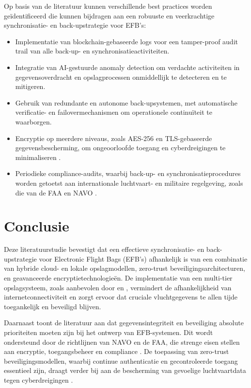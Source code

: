 Op basis van de literatuur kunnen verschillende best practices worden geïdentificeerd die kunnen bijdragen aan een robuuste en veerkrachtige synchronisatie- en back-upstrategie voor EFB’s:
\begin{itemize}
    \item Implementatie van blockchain-gebaseerde logs voor een tamper-proof audit trail van alle back-up- en synchronisatieactiviteiten.
    \item Integratie van AI-gestuurde anomaly detection om verdachte activiteiten in gegevensoverdracht en opslagprocessen onmiddellijk te detecteren en te mitigeren.
    \item Gebruik van redundante en autonome back-upsystemen, met automatische verificatie- en failovermechanismen om operationele continuïteit te waarborgen.
    \item Encryptie op meerdere niveaus, zoals AES-256 en TLS-gebaseerde gegevensbescherming, om ongeoorloofde toegang en cyberdreigingen te minimaliseren \autocite{NISTFIPS140}.
    \item Periodieke compliance-audits, waarbij back-up- en synchronisatieprocedures worden getoetst aan internationale luchtvaart- en militaire regelgeving, zoals die van de FAA \autocite{FAA_AC91-78A} en NAVO \autocite{AD070001}.
\end{itemize}

        
\section{Conclusie}
\label{sec:conclusie}

Deze literatuurstudie bevestigt dat een effectieve synchronisatie- en back-upstrategie voor Electronic Flight Bags (EFB’s) afhankelijk is van een combinatie van hybride cloud- en lokale opslagmodellen, zero-trust beveiligingsarchitecturen, en geavanceerde encryptietechnologieën. De implementatie van een multi-tier opslagsysteem, zoals aanbevolen door \textcite{AWSBackup} en \textcite{MicrosoftBackup}, vermindert de afhankelijkheid van internetconnectiviteit en zorgt ervoor dat cruciale vluchtgegevens te allen tijde toegankelijk en beveiligd blijven.

Daarnaast toont de literatuur aan dat gegevensintegriteit en beveiliging absolute prioriteiten moeten zijn bij het ontwerp van EFB-systemen. Dit wordt ondersteund door de richtlijnen van NAVO en de FAA, die strenge eisen stellen aan encryptie, toegangsbeheer en compliance \autocite{FAA_AC91-78A, AD070001}. De toepassing van zero-trust beveiligingsmodellen, waarbij continue authenticatie en gecontroleerde toegang essentieel zijn, draagt verder bij aan de bescherming van gevoelige luchtvaartdata tegen cyberdreigingen \autocite{VinayakBhuvi}.

